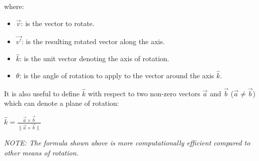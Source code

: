 where:
\begin{itemize}
    \item $\vec{v}$: is the vector to rotate.
    \item $\vec{v'}$: is the resulting rotated vector along the axis.
    \item $\hat{k}$: is the unit vector denoting the axis of rotation.
    \item $\theta$: is the angle of rotation to apply to the vector around the axis $\hat{k}$.
\end{itemize}

It is also useful to define $\hat{k}$ with respect to two non-zero vectors $\vec{a}$ and $\vec{b}$ ($\vec{a} \neq \vec{b}$) which
can denote a plane of rotation:

\begin{center}
    $\hat{k} = \frac{\vec{a} \times \vec{b}}{\|\vec{a} \times \vec{b}\|}$
\end{center}

\vspace{.5em}

\emph{
    NOTE: The formula shown above is more computationally efficient compared to
    other means of rotation.
}










